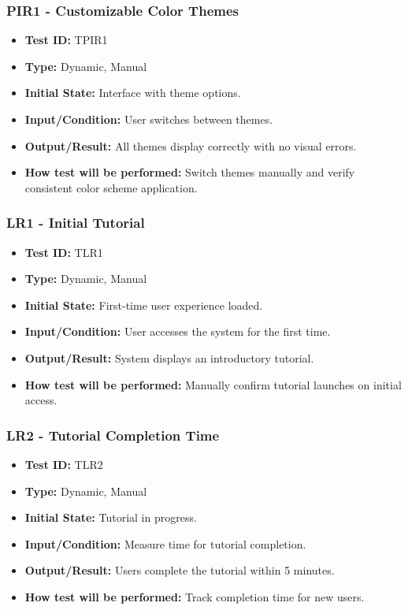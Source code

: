 \documentclass[12pt, titlepage]{article}
\begin{document}
\subsubsection{PIR1 - Customizable Color Themes}
\begin{itemize}
    \item \textbf{Test ID:} TPIR1
    \item \textbf{Type:} Dynamic, Manual
    \item \textbf{Initial State:} Interface with theme options.
    \item \textbf{Input/Condition:} User switches between themes.
    \item \textbf{Output/Result:} All themes display correctly with no visual errors.
    \item \textbf{How test will be performed:} Switch themes manually and verify consistent color scheme application.
\end{itemize}

\subsubsection{LR1 - Initial Tutorial}
\begin{itemize}
    \item \textbf{Test ID:} TLR1
    \item \textbf{Type:} Dynamic, Manual
    \item \textbf{Initial State:} First-time user experience loaded.
    \item \textbf{Input/Condition:} User accesses the system for the first time.
    \item \textbf{Output/Result:} System displays an introductory tutorial.
    \item \textbf{How test will be performed:} Manually confirm tutorial launches on initial access.
\end{itemize}

\subsubsection{LR2 - Tutorial Completion Time}
\begin{itemize}
    \item \textbf{Test ID:} TLR2
    \item \textbf{Type:} Dynamic, Manual
    \item \textbf{Initial State:} Tutorial in progress.
    \item \textbf{Input/Condition:} Measure time for tutorial completion.
    \item \textbf{Output/Result:} Users complete the tutorial within 5 minutes.
    \item \textbf{How test will be performed:} Track completion time for new users.
\end{itemize}
\end{document}
